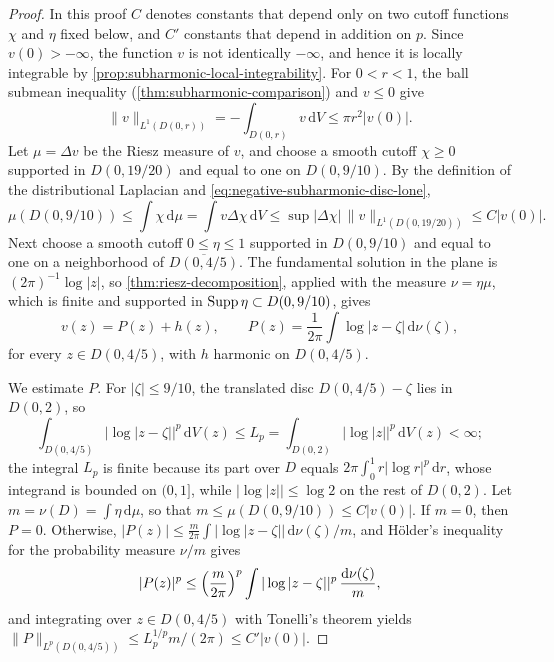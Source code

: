 \begin{proof}
In this proof $C$ denotes constants that depend only on two cutoff functions $\chi$ and $\eta$ fixed below, and $C'$ constants that depend in addition on $p$. Since $v(0)>-\infty$, the function $v$ is not identically $-\infty$, and hence it is locally integrable by \cref{prop:subharmonic-local-integrability}. For $0<r<1$, the ball submean inequality (\cref{thm:subharmonic-comparison}) and $v\leq0$ give
\begin{equation}\label{eq:negative-subharmonic-disc-lone}
 \|v\|_{L^1(D(0,r))}=-\int_{D(0,r)}v\,\mathrm dV\leq\pi r^2|v(0)|.
\end{equation}
Let $\mu=\Delta v$ be the Riesz measure of $v$, and choose a smooth cutoff $\chi\geq0$ supported in $D(0,19/20)$ and equal to one on $D(0,9/10)$. By the definition of the distributional Laplacian and \eqref{eq:negative-subharmonic-disc-lone},
\[
 \mu(D(0,9/10))\leq\int\chi\,\mathrm d\mu
   =\int v\Delta\chi\,\mathrm dV\leq\sup|\Delta\chi|\,\|v\|_{L^1(D(0,19/20))}\leq C|v(0)|.
\]
Next choose a smooth cutoff $0\leq\eta\leq1$ supported in $D(0,9/10)$ and equal to one on a neighborhood of $\overline{D(0,4/5)}$. The fundamental solution in the plane is $(2\pi)^{-1}\log|z|$, so \cref{thm:riesz-decomposition}, applied with the measure $\nu=\eta\mu$, which is finite and supported in $\operatorname{Supp}\eta\subset D(0,9/10)$, gives
\[
 v(z)=P(z)+h(z),\qquad
 P(z)=\frac1{2\pi}\int\log|z-\zeta|\,\mathrm d\nu(\zeta),
\]
for every $z\in D(0,4/5)$, with $h$ harmonic on $D(0,4/5)$.

We estimate $P$. For $|\zeta|\leq9/10$, the translated disc $D(0,4/5)-\zeta$ lies in $D(0,2)$, so
\[
 \int_{D(0,4/5)}|\log|z-\zeta||^p\,\mathrm dV(z)
     \leq L_p=\int_{D(0,2)}|\log|z||^p\,\mathrm dV(z)<\infty;
\]
the integral $L_p$ is finite because its part over $D$ equals $2\pi\int_0^1r|\log r|^p\,\mathrm dr$, whose integrand is bounded on $(0,1]$, while $|\log|z||\leq\log2$ on the rest of $D(0,2)$. Let $m=\nu(D)=\int\eta\,\mathrm d\mu$, so that $m\leq\mu(D(0,9/10))\leq C|v(0)|$. If $m=0$, then $P=0$. Otherwise, $|P(z)|\leq\frac m{2\pi}\int|\log|z-\zeta||\,\mathrm d\nu(\zeta)/m$, and H\"older's inequality for the probability measure $\nu/m$ gives
\[
 |P(z)|^p\leq\Bigl(\frac m{2\pi}\Bigr)^p\int|\log|z-\zeta||^p\,\frac{\mathrm d\nu(\zeta)}m,
\]
and integrating over $z\in D(0,4/5)$ with Tonelli's theorem yields $\|P\|_{L^p(D(0,4/5))}\leq L_p^{1/p}m/(2\pi)\leq C'|v(0)|$.


\end{proof}
